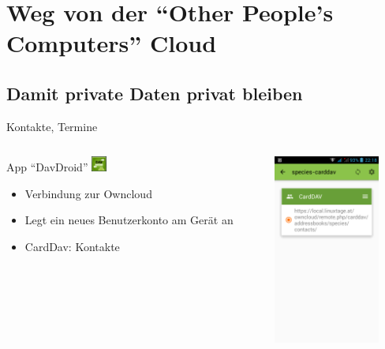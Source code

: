 \documentclass{beamer}
\begin{document}
\section{Weg von der "`Other People's Computers"' Cloud}

\subsection{Damit private Daten privat bleiben}

\begin{frame}{Kontakte, Termine}
  

\begin{columns}[c]
  \begin{column}[T]{.7\textwidth}
    App "`DavDroid"' \includegraphics[width=0.5cm]{dav.png}

    \begin{itemize}
      \item Verbindung zur Owncloud
      \item Legt ein neues Benutzerkonto am Gerät an
    \vspace{0.5cm}
      \item CardDav: Kontakte
    \end{itemize}
  \end{column}
  \begin{column}[T]{.3\textwidth}
    \includegraphics[width=3.5cm]{carddav.png} 
   \end{column}
\end{columns}

        \pause

\begin{columns}[c]
  \begin{column}[T]{.7\textwidth}


\end{column}
\end{columns}
\end{frame}
\end{document}
